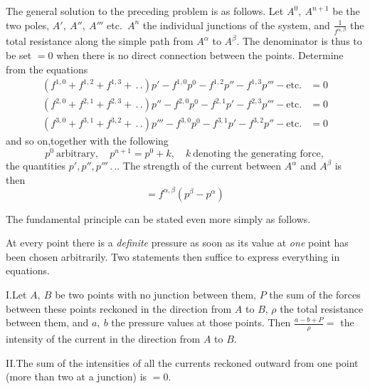 \vspace{3mm}
The general solution to the preceding problem is as follows. Let $A^0,\ A^{n+1}$ be the two poles, $A',\ A'',\ A'''$ etc.\ $A^n$ the individual junctions of the system, and $\frac{1}{f^{\alpha,\beta}}$ the total resistance along the simple path from $A^\alpha$ to $A^\beta$. The denominator is thus to be set $=0$ when there is no direct connection between the points. Determine from the equations
\[
\begin{aligned}
(f^{1,0}+f^{1,2}+f^{1,3}+\,.\,.)p'-f^{1,0}p^0-f^{1,2}p''-f^{1,3}p'''-\text{etc.}&=0\\
(f^{2,0}+f^{2,1}+f^{2,3}+\,.\,.)p''-f^{2,0}p^0-f^{2,1}p'-f^{2,3}p'''-\text{etc.}&=0\\
(f^{3,0}+f^{3,1}+f^{3,2}+\,.\,.)p'''-f^{3,0}p^0-f^{3,1}p'-f^{3,2}p''-\text{etc.}&=0
\end{aligned}
\]
and so on,\quad together with the following
\[
p^0\ \text{arbitrary},\quad p^{n+1}=p^0+k,\quad k\ \text{denoting the generating force},
\]
the quantities $p',p'',p'''\,.\,.$. The strength of the current between $A^\alpha$ and $A^\beta$ is then
\[
=f^{\alpha,\beta}(p^\beta-p^\alpha)
\]

\vspace{3mm}
The fundamental principle can be stated even more simply as follows.

At every point there is a \textit{definite} pressure as soon as its value at \textit{one} point has been chosen arbitrarily. Two statements then suffice to express everything in equations.

I.\quad Let $A,\ B$ be two points with no junction between them, $P$ the sum of the forces between these points reckoned in the direction from $A$ to $B$, $\rho$ the total resistance between them, and $a,\ b$ the pressure values at those points. Then $\frac{a-b+P}{\rho}=$ the intensity of the current in the direction from $A$ to $B$.

II.\quad The sum of the intensities of all the currents reckoned outward from one point (more than two at a junction) is $=0$.

